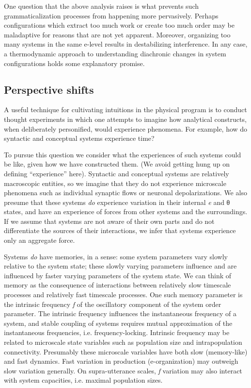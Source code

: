 One question that the above analysis raises is what prevents such grammaticalization processes from happening more pervasively. Perhaps configurations which extract too much work or create too much order may be maladaptive for reasons that are not yet apparent. Moreover, organizing too many systems in the same e-level results in destabilizing interference. In any case, a thermodynamic approach to understanding diachronic changes in system configurations holds some explanatory promise.

\subsection{Perspective shifts}

A useful technique for cultivating intuitions in the physical program is to conduct thought experiments in which one attempts to imagine how analytical constructs, when deliberately personified, would experience phenomena. For example, how do syntactic and conceptual systems experience time? 

  To pursue this question we consider what the experiences of such systems could be like, given how we have constructed them. (We avoid getting hung up on defining “experience” here). Syntactic and conceptual systems are relatively macroscopic entities, so we imagine that they do not experience microscale phenomena such as individual synaptic flows or neuronal depolarizations. We also presume that these systems \textit{do} experience variation in their internal \textit{e} and θ states, and have an experience of forces from other systems and the surroundings. If we assume that systems are not aware of their own parts and do not differentiate the sources of their interactions, we infer that systems experience only an aggregate force. 

  Systems \textit{do} have memories, in a sense: some system parameters vary slowly relative to the system state; these slowly varying parameters influence and are influenced by faster varying parameters of the system state. We can think of memory as the consequence of interactions between relatively slow timescale processes and relatively fast timescale processes. One such memory parameter is the intrinsic frequency \textit{f} of the oscillatory component of the system order parameter. The intrinsic frequency influences the instantaneous frequency of a system, and stable coupling of systems requires mutual approximation of the instantaneous frequencies, i.e. frequency-locking. Intrinsic frequency may be related to microscale state variables such as population size and intrapopulation connectivity. Presumably these microscale variables have both slow (memory-like) and fast dynamics. Fast variation in production (e-organization) may outweigh slow variation generally. On supra-utterance scales, \textit{f} variation may also interact with system capacities, i.e. maximal population sizes. 

